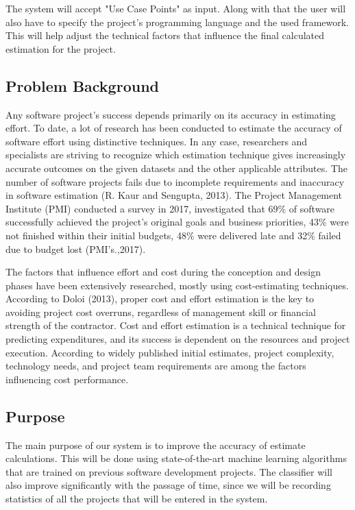 The system will accept "Use Case Points" as input. Along with that the user will also have to specify the project's programming language and the used framework. This will help adjust the technical factors that influence the final calculated estimation for the project. 






\subsection{Problem Background}
Any software project’s success depends primarily on its accuracy in estimating effort. To date, a lot of research has been conducted to estimate the accuracy of software effort using distinctive techniques. In any case, researchers and specialists are striving to recognize which estimation technique gives increasingly accurate outcomes on the given datasets and the other applicable attributes. The number of software projects fails due to incomplete requirements and inaccuracy in software estimation (R. Kaur and Sengupta, 2013). The Project Management Institute (PMI) conducted a survey in 2017, investigated that 69\% of software successfully achieved the project’s original goals and business priorities, 43\% were not finished within their initial budgets, 48\% were delivered late and 32\% failed due to budget lost (PMI's.,2017).


The factors that influence effort and cost during the conception and design phases have been extensively researched, mostly using cost-estimating techniques. According to Doloi (2013), proper cost and effort estimation is the key to avoiding project cost overruns, regardless of management skill or financial strength of the contractor. Cost and effort estimation is a technical technique for predicting expenditures, and its success is dependent on the resources and project execution.
According to widely published initial estimates, project complexity, technology needs, and project team requirements are among the factors influencing cost performance.






\subsection{Purpose}
The main purpose of our system is to improve the accuracy of estimate calculations. This will be done using state-of-the-art machine learning algorithms that are trained on previous software development projects. The classifier will also improve significantly with the passage of time, since we will be recording statistics of all the projects that will be entered in the system.

